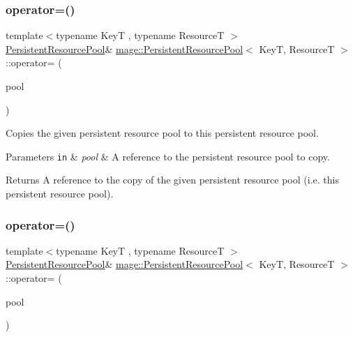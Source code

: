 \subsubsection{\texorpdfstring{operator=()}{operator=()}\hspace{0.1cm}{\footnotesize\ttfamily [1/2]}}
{\footnotesize\ttfamily template$<$typename KeyT , typename ResourceT $>$ \\
\hyperlink{classmage_1_1_persistent_resource_pool}{Persistent\+Resource\+Pool}\& \hyperlink{classmage_1_1_persistent_resource_pool}{mage\+::\+Persistent\+Resource\+Pool}$<$ KeyT, ResourceT $>$\+::operator= (\begin{DoxyParamCaption}\item[{const \hyperlink{classmage_1_1_persistent_resource_pool}{Persistent\+Resource\+Pool}$<$ KeyT, ResourceT $>$ \&}]{pool }\end{DoxyParamCaption})\hspace{0.3cm}{\ttfamily [delete]}}

Copies the given persistent resource pool to this persistent resource pool.


\begin{DoxyParams}[1]{Parameters}
\mbox{\tt in}  & {\em pool} & A reference to the persistent resource pool to copy. \\
\hline
\end{DoxyParams}
\begin{DoxyReturn}{Returns}
A reference to the copy of the given persistent resource pool (i.\+e. this persistent resource pool). 
\end{DoxyReturn}
\hypertarget{classmage_1_1_persistent_resource_pool_adcec8a286b15174ee99200b68ba0589e}{}\label{classmage_1_1_persistent_resource_pool_adcec8a286b15174ee99200b68ba0589e} 
\subsubsection{\texorpdfstring{operator=()}{operator=()}\hspace{0.1cm}{\footnotesize\ttfamily [2/2]}}
{\footnotesize\ttfamily template$<$typename KeyT , typename ResourceT $>$ \\
\hyperlink{classmage_1_1_persistent_resource_pool}{Persistent\+Resource\+Pool}\& \hyperlink{classmage_1_1_persistent_resource_pool}{mage\+::\+Persistent\+Resource\+Pool}$<$ KeyT, ResourceT $>$\+::operator= (\begin{DoxyParamCaption}\item[{\hyperlink{classmage_1_1_persistent_resource_pool}{Persistent\+Resource\+Pool}$<$ KeyT, ResourceT $>$ \&\&}]{pool }\end{DoxyParamCaption})\hspace{0.3cm}{\ttfamily [delete]}}

